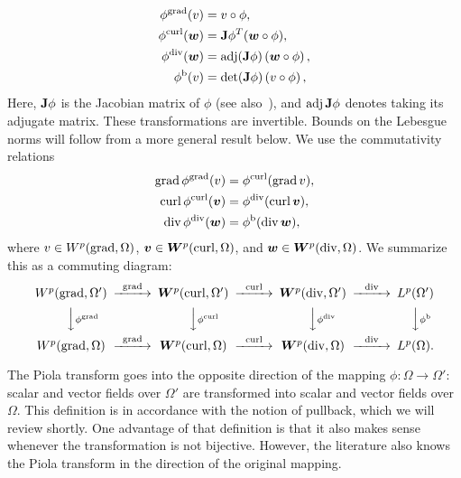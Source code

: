 \documentclass[10pt,a4paper]{article}
\begin{document}
\begin{subequations}\label{eq_definition_piola}
\begin{align*}
    \phi^{\operatorname{grad}}(v) &= v \circ \phi, \\
    \phi^{\operatorname{curl}}(\bm{w}) &= {\mathbf{J}}\phi^{T} (\bm{w} \circ \phi), \\
    \phi^{\operatorname{div}}(\bm{w}) &= \operatorname{adj}({\mathbf{J}}\phi) \left( \bm{w} \circ \phi \right), \\  
    \phi^{\rm b}(v) &= \det({\mathbf{J}}\phi) \left( v \circ \phi \right),
\end{align*}
\end{subequations}
Here, ${\mathbf{J}}\phi$ is the Jacobian matrix of $\phi$ (see also~\cite[Definition~9.8]{ern2021finite}), and $\operatorname{adj}{\mathbf{J}}\phi$ denotes taking its adjugate matrix.
These transformations are invertible. 
Bounds on the Lebesgue norms will follow from a more general result below. 
We use the commutativity relations 
\begin{subequations}\label{eq_piola_commute}
\begin{align}
    \operatorname{grad} \phi^{\operatorname{grad}} (v) &= \phi^{\operatorname{curl}}(\operatorname{grad} v), 
    \\
    \operatorname{curl} \phi^{\operatorname{curl}}(\bm{v}) &= \phi^{\operatorname{div}}(\operatorname{curl} \bm{v}), 
    \\
    \operatorname{div} \phi^{\operatorname{div}}(\bm{w}) &= \phi^{\rm b}(\operatorname{div} \bm{w}),
\end{align}
\end{subequations}
where $v \in W^{p}(\operatorname{grad},\Omega)$, $\bm{v} \in \bm{W}^{p}(\operatorname{curl},\Omega)$, and $\bm{w} \in \bm{W}^{p}(\operatorname{div},\Omega)$.  
We summarize this as a commuting diagram:
\begin{align*}
    \begin{CD}
        W^{p}(\grad,\Omega') @>{\grad}>> \bfW^{p}(\curl,\Omega') @>{\curl}>> \bfW^{p}(\divergence,\Omega') @>{\divergence}>> L^{p}(\Omega')
        \\
        @VV{\phi^{\grad}}V 
        @VV{\phi^{\curl}}V 
        @VV{\phi^{\divergence}}V 
        @VV{\phi^{\rm b}}V 
        \\
        W^{p}(\grad,\Omega ) @>{\grad}>> \bfW^{p}(\curl,\Omega ) @>{\curl}>> \bfW^{p}(\divergence,\Omega ) @>{\divergence}>> L^{p}(\Omega ).
    \end{CD}
\end{align*}

\begin{remark}
    The Piola transform goes into the opposite direction of the mapping $\phi : \Omega \rightarrow \Omega'$:
    scalar and vector fields over $\Omega'$ are transformed into scalar and vector fields over $\Omega$.
    This definition is in accordance with the notion of pullback, which we will review shortly. 
    One advantage of that definition is that it also makes sense whenever the transformation is not bijective. 
    However, the literature also knows the Piola transform in the direction of the original mapping. 
\end{remark}
\end{document}
